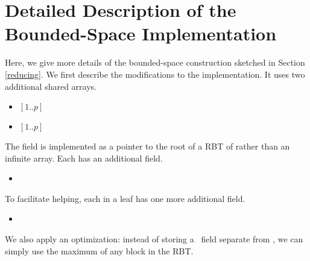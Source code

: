 
\section{Detailed Description of the Bounded-Space Implementation}
\label{reducing-details}

\renewcommand{\algorithmiccomment}[1]{\hfill\eqparbox{COMMENTSINGLEAPP}{\com\ #1}}

Here, we give more details of the bounded-space construction sketched in Section \ref{reducing}.
We first describe the modifications to the implementation.
It uses two additional shared arrays.
\begin{itemize}
\item {} $[1..p]$ 
\item {} $[1..p]$ 
\end{itemize}
The  field is implemented as a pointer to the root of a RBT of  rather than an infinite array.
Each  has an additional field.
\begin{itemize}
\item {}  
\end{itemize}
To facilitate helping, each  in a leaf has one more additional field.
\begin{itemize}
\item {}  
\end{itemize}
We also apply an optimization:  instead of storing a \head\ field separate from ,
we can simply use the maximum  of any block in the  RBT.

\renewcommand{\algorithmiccomment}[1]{\hfill\eqparbox{COMMENTDOUBLE}{\com\ #1}}


